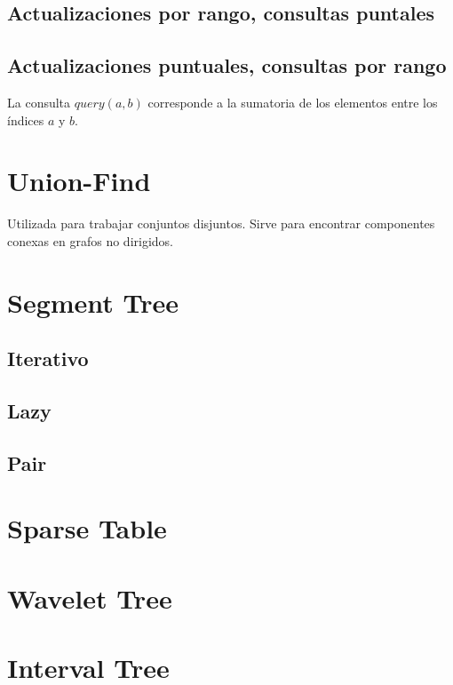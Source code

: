 \documentclass[oneside]{book}
\begin{document}
	\subsection{Actualizaciones por rango, consultas puntales }
	
	\pagebreak
	\subsection{Actualizaciones puntuales, consultas por rango}
	La consulta $query(a,b)$ corresponde a la sumatoria de los elementos entre los \'indices $a$ y $b$. 
	
	
	\section{Union-Find}
	Utilizada para trabajar conjuntos disjuntos. Sirve para encontrar componentes conexas en grafos no dirigidos.   
	
	\section{Segment Tree}
		\subsection{Iterativo}
			
		\subsection{Lazy}
			
		\subsection{Pair}
			
	\section{Sparse Table}
		
			
	\section{Wavelet Tree}
		
		\section{Interval Tree}
		
\end{document}
